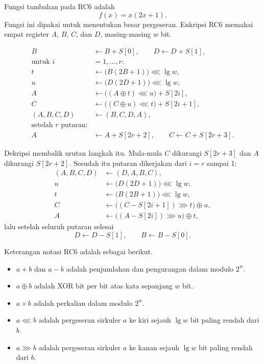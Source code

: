 Fungsi tambahan pada RC6 adalah
\[
f(x) = x(2x + 1).
\]
Fungsi ini dipakai untuk menentukan besar pergeseran. Enkripsi RC6 memakai empat
register $A$, $B$, $C$, dan $D$, masing-masing $w$ bit.

\begin{equation}
\begin{aligned}
B &\leftarrow B + S[0], \qquad D \leftarrow D + S[1], \\
\text{untuk } i &= 1, \dots, r: \\
t &\leftarrow \bigl( B(2B+1) \bigr) \lll \lg w, \\
u &\leftarrow \bigl( D(2D+1) \bigr) \lll \lg w, \\
A &\leftarrow \bigl( (A \oplus t) \lll u \bigr) + S[2i], \\
C &\leftarrow \bigl( (C \oplus u) \lll t \bigr) + S[2i+1], \\
(A,B,C,D) &\leftarrow (B,C,D,A), \\
\text{setelah } r \text{ putaran:} \\
A &\leftarrow A + S[2r+2], \qquad C \leftarrow C + S[2r+3].
\end{aligned}
\label{eq:rc6-putaran}
\end{equation}

Dekripsi membalik urutan langkah itu. Mula-mula $C$ dikurangi $S[2r+3]$ dan $A$
dikurangi $S[2r+2]$. Sesudah itu putaran dikerjakan dari $i = r$ sampai 1:
\[
\begin{aligned}
(A,B,C,D) &\leftarrow (D,A,B,C), \\
u &\leftarrow \bigl( D(2D+1) \bigr) \lll \lg w, \\
t &\leftarrow \bigl( B(2B+1) \bigr) \lll \lg w, \\
C &\leftarrow \bigl( (C - S[2i+1]) \ggg t \bigr) \oplus u, \\
A &\leftarrow \bigl( (A - S[2i]) \ggg u \bigr) \oplus t,
\end{aligned}
\]
lalu setelah seluruh putaran selesai
\[
D \leftarrow D - S[1], \qquad B \leftarrow B - S[0].
\]

Keterangan notasi RC6 adalah sebagai berikut.
\begin{itemize}
    \item $a + b$ dan $a - b$ adalah penjumlahan dan pengurangan dalam modulo
          $2^w$.
    \item $a \oplus b$ adalah XOR bit per bit atas kata sepanjang $w$ bit.
    \item $a \times b$ adalah perkalian dalam modulo $2^w$.
    \item $a \lll b$ adalah pergeseran sirkuler $a$ ke kiri sejauh $\lg w$ bit
          paling rendah dari $b$.
    \item $a \ggg b$ adalah pergeseran sirkuler $a$ ke kanan sejauh $\lg w$ bit
          paling rendah dari $b$.
\end{itemize}
